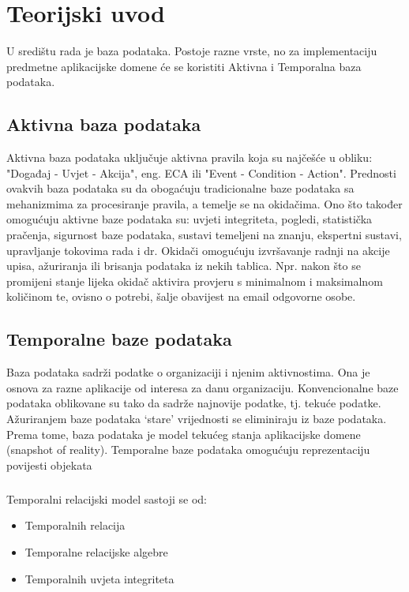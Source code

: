 \documentclass[a4paper,12pt]{foi}
\begin{document}
\chapter{Teorijski uvod}

U središtu rada je baza podataka. Postoje razne vrste, no za implementaciju predmetne aplikacijske domene će se koristiti Aktivna i Temporalna baza podataka.

\section{Aktivna baza podataka}

Aktivna baza podataka uključuje aktivna pravila koja su najčešće u obliku: "Događaj - Uvjet - Akcija", eng. ECA ili "Event - Condition - Action".
Prednosti ovakvih baza podataka su da obogaćuju tradicionalne baze podataka sa mehanizmima za procesiranje pravila, a temelje se na okidačima. Ono što također omogućuju aktivne baze podataka su: uvjeti integriteta, pogledi, statistička pračenja, sigurnost baze podataka, sustavi temeljeni na znanju, ekspertni sustavi, upravljanje tokovima rada i dr. \citep[][]{Schatten2008}
Okidači omogućuju izvršavanje radnji na akcije upisa, ažuriranja ili brisanja podataka
iz nekih tablica. Npr. nakon što se promijeni stanje lijeka okidač aktivira provjeru s minimalnom i maksimalnom količinom te, ovisno o potrebi, šalje obavijest na email odgovorne osobe.

\section{Temporalne baze podataka}

Baza podataka sadrži podatke o organizaciji i njenim aktivnostima. Ona je osnova za razne aplikacije
od interesa za danu organizaciju. Konvencionalne baze podataka oblikovane su tako da sadrže najnovije
podatke,   tj.   tekuće   podatke.   Ažuriranjem   baze   podataka   ‘stare’   vrijednosti   se   eliminiraju   iz   baze
podataka.   Prema   tome,   baza   podataka   je   model   tekućeg   stanja   aplikacijske   domene   (snapshot   of
reality). Temporalne baze podataka  omogućuju reprezentaciju povijesti objekata \citep{Malekovic2017}

\paragraph{}

Temporalni relacijski model sastoji se od:
\begin{itemize}
	\item Temporalnih relacija
	\item Temporalne relacijske algebre
	\item Temporalnih uvjeta integriteta
\end{itemize}
\end{document}
